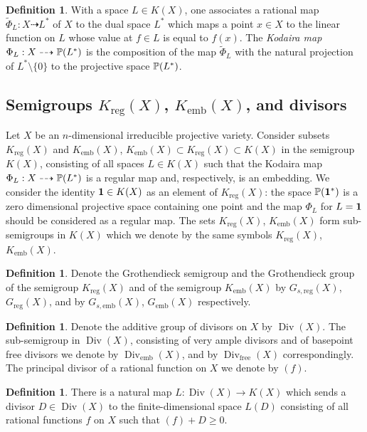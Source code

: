 \documentclass[11pt]{article}
\theoremstyle{plain}
\theoremstyle{definition}
\newtheorem{definition}[theorem]{Definition}
\newcommand\Div{\operatorname{Div}}
\begin{document}
\begin{definition} With a space $L\in K(X)$, one associates a rational map $\tilde  \Phi_L:X\dashrightarrow  L^*$ of $X$ to the dual space $L^*$  which maps a point $x\in X$ to the linear function on $L$ whose value at $f\in L$ is equal to $f(x)$. The {\it Kodaira map} $\Phi_L:X\dashrightarrow  \Bbb P( L^*)$ is the composition of the map $\tilde \Phi_L$ with the natural projection of $L^*\setminus \{0\}$ to the projective space $\Bbb P(L^*)$.
\end{definition}


\subsection{Semigroups $K_\mathrm{reg}(X)$, $K_\mathrm{emb}(X)$,  and   divisors}\label{regularsemigroup}
Let $X$ be  an $n$-dimensional irreducible  projective variety.
Consider subsets $K_\mathrm{reg}(X)$ and $K_\mathrm{emb}(X)$, $K_\mathrm{emb}(X) \subset K_\mathrm{reg}(X)\subset K(X)$  in the semigroup $K(X)$,   consisting  of all spaces $L\in K(X)$ such that  the  Kodaira map $\Phi_L:X\dashrightarrow  \Bbb P(L^*)$ is a regular map and, respectively, is an embedding.
We consider the identity  $\bold 1\in K(X)$ as an element of $K_\mathrm{reg}(X)$: the space $\Bbb P(\bold 1^*)$
is a zero dimensional projective space containing one point and the map $\Phi_L$  for $L=\bold 1$ should be considered as a regular map.
The  sets $K_\mathrm{reg}(X)$, $K_\mathrm{emb}(X)$  form sub-semigroups in $K(X)$ which we denote by the same symbols $K_\mathrm{reg}(X)$, $K_\mathrm{emb}(X)$.


\begin{definition}
Denote  the Grothendieck semigroup and the Grothendieck group of the semigroup $K_\mathrm{reg}(X)$ and of the semigroup $K_\mathrm{emb}(X)$ by $G_{s,\mathrm{reg}}(X)$, $G_\mathrm{reg}(X)$, and by $G_{s,\mathrm{emb}}(X)$, $G_\mathrm{emb}(X)$ respectively.
\end{definition}

\begin{definition}
Denote the additive group  of   divisors on $X$ by $\Div(X)$. The sub-semigroup in $\Div(X)$, consisting of very ample divisors and of basepoint free divisors  we  denote by $\Div_\mathrm{emb}(X)$, and by $\Div_\mathrm{free}(X)$ correspondingly.  The  principal divisor of a rational function on $X$  we denote by $(f)$.
\end{definition}

\begin{definition}
There is a natural map $L:\Div(X)\to K(X)$  which sends a    divisor $D\in \Div(X)$  to the  finite-dimensional space $L(D)$  consisting of all rational functions $f$ on $X$ such that $(f)+D\geq 0$.
\end{definition}
\end{document}
